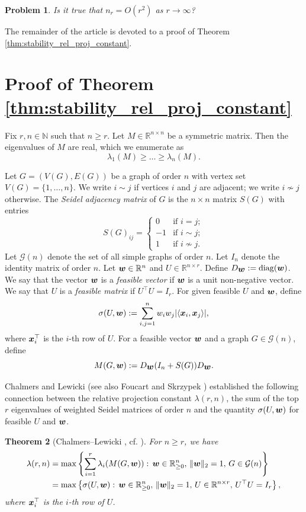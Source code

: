 \documentclass[11pt]{article}
\theoremstyle{plain}
\newtheorem{theorem}{Theorem}[section]
\newtheorem{problem}[theorem]{Problem}
\numberwithin{equation}{section}
\DeclareMathOperator{\diag}{diag}
\def\w{\mbox{\boldmath $w$}}
\def\x{\mbox{\boldmath $x$}}
\newcommand{\ip}[2]{\langle #1, #2 \rangle}
\begin{document}
\begin{problem}
Is it true that $n_r = O(r^2)$ as $r\to \infty$? 
\end{problem}

The remainder of the article is devoted to a proof of Theorem \ref{thm:stability_rel_proj_constant}.

\section{Proof of Theorem \ref{thm:stability_rel_proj_constant}}

Fix $r, n\in \mathbb{N}$ such that $n\ge r$. Let $M\in \mathbb{R}^{n\times n}$ be a symmetric matrix. Then the eigenvalues of $M$ are real, which we enumerate as 
\[\lambda_1(M)\ge \ldots\ge \lambda_n(M).\]

Let $G = (V(G), E(G))$ be a graph of order $n$ with vertex set $V(G) = \{1, \ldots, n\}$. We write $i\sim j$ if vertices $i$ and $j$ are adjacent; we write $i\nsim j$ otherwise. The \emph{Seidel adjacency matrix} of $G$ is the $n\times n$ matrix $S(G)$ with entries 
\[S(G)_{ij} = 
\begin{cases}
    0 & \text{if }i=j;\\
    -1 & \text{if }i\sim j;\\
    1 & \text{if }i\nsim j. 
\end{cases}\]
Let $\mathcal{G}(n)$ denote the set of all simple graphs of order $n$. Let $I_n$ denote the identity matrix of order $n$. Let $\w\in \mathbb{R}^n$ and $U\in \mathbb{R}^{n\times r}$. Define $D_{\w}:=\diag(\w)$. We say that the vector $\w$ is a \emph{feasible vector} if $\w$ is a unit non-negative vector. We say that $U$ is a \emph{feasible matrix} if $U^\top U = I_r$. For given feasible $U$ and $\w$, define 
\[ \sigma(U, \w):=\sum_{i,j=1}^n w_iw_j|\ip{\x_i}{\x_j}|,\]
where $\x_i^\top$ is the $i$-th row of $U$. For a feasible vector $\w$ and a graph $G\in \mathcal{G}(n)$, define
\[ M(G, \w):= D_{\w}(I_n+S(G))D_{\w}.\]

Chalmers and Lewicki \cite{Chalmers_Lewicki_2010} (see also Foucart and Skrzypek \cite{Foucart_Skryzpek_2017}) established the following connection between the relative projection constant $\lambda(r,n)$, the sum of the top $r$ eigenvalues of weighted Seidel matrices of order $n$ and the quantity $\sigma(U, \w)$ for feasible $U$ and $\w$.

\begin{theorem}[Chalmers--Lewicki \cite{Chalmers_Lewicki_2010}, cf. {\cite[Theorem 1]{Foucart_Skryzpek_2017}}]\label{thm:relative_top_r_sum_characterization} For $n\ge r$, we have 
\begin{align*}
    \lambda(r,n) & = \max \left\{\sum_{i=1}^r \lambda_i(M(G, \w)):\, \w \in \mathbb{R}_{\ge 0}^n,\, \|\w\|_2= 1,\, G\in \mathcal{G}(n)\right\}\\
    & = \max\left\{\sigma(U, \w): \, \w \in \mathbb{R}_{\ge 0}^n,\, \|\w\|_2= 1,\, U\in \mathbb{R}^{n\times r},\, U^\top U = I_r\right\},
\end{align*}
where $\x_i^\top$ is the $i$-th row of $U$.
\end{theorem}
\end{document}
